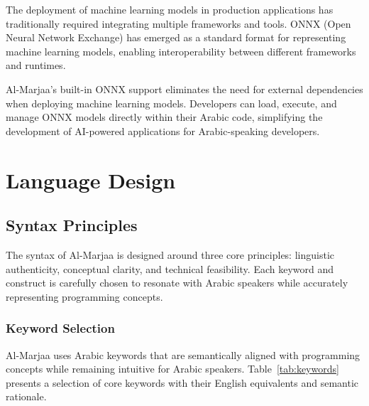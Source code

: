 \documentclass[11pt,a4paper]{article}
\begin{document}
The deployment of machine learning models in production applications has traditionally required integrating multiple frameworks and tools. ONNX (Open Neural Network Exchange) has emerged as a standard format for representing machine learning models, enabling interoperability between different frameworks and runtimes.

Al-Marjaa's built-in ONNX support eliminates the need for external dependencies when deploying machine learning models. Developers can load, execute, and manage ONNX models directly within their Arabic code, simplifying the development of AI-powered applications for Arabic-speaking developers.

\section{Language Design}

\subsection{Syntax Principles}

The syntax of Al-Marjaa is designed around three core principles: linguistic authenticity, conceptual clarity, and technical feasibility. Each keyword and construct is carefully chosen to resonate with Arabic speakers while accurately representing programming concepts.

\subsubsection{Keyword Selection}

Al-Marjaa uses Arabic keywords that are semantically aligned with programming concepts while remaining intuitive for Arabic speakers. Table~\ref{tab:keywords} presents a selection of core keywords with their English equivalents and semantic rationale.
\end{document}
